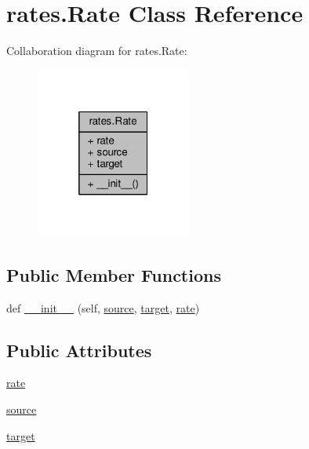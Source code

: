 \hypertarget{classrates_1_1_rate}{}\section{rates.\+Rate Class Reference}
\label{classrates_1_1_rate}


Collaboration diagram for rates.\+Rate\+:\nopagebreak
\begin{figure}[H]
\begin{center}
\leavevmode
\includegraphics[width=145pt]{classrates_1_1_rate__coll__graph}
\end{center}
\end{figure}
\subsection*{Public Member Functions}
\begin{DoxyCompactItemize}
\item 
def \hyperlink{classrates_1_1_rate_a935221ad61f9c683e6da812ac7f53cc3}{\+\_\+\+\_\+init\+\_\+\+\_\+} (self, \hyperlink{classrates_1_1_rate_a82a6abb7536f2a4393f43456cfb1dc5e}{source}, \hyperlink{classrates_1_1_rate_adb1bbb0977c838106cb181a5941612c8}{target}, \hyperlink{classrates_1_1_rate_a5a660cfdfaa515a6e5809492525d61a7}{rate})
\end{DoxyCompactItemize}
\subsection*{Public Attributes}
\begin{DoxyCompactItemize}
\item 
\hyperlink{classrates_1_1_rate_a5a660cfdfaa515a6e5809492525d61a7}{rate}
\item 
\hyperlink{classrates_1_1_rate_a82a6abb7536f2a4393f43456cfb1dc5e}{source}
\item 
\hyperlink{classrates_1_1_rate_adb1bbb0977c838106cb181a5941612c8}{target}
\end{DoxyCompactItemize}


